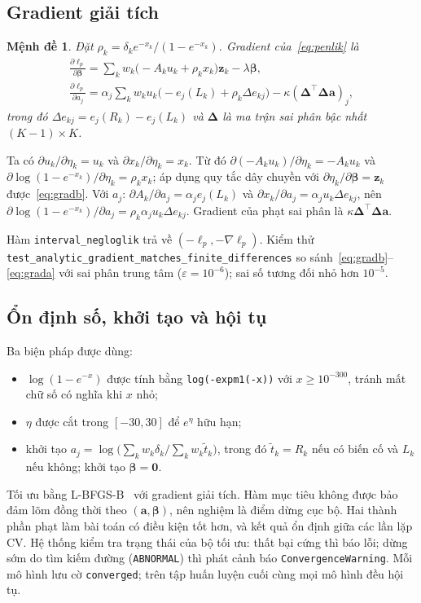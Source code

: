\documentclass[journal]{IEEEtran}
\newtheorem{proposition}{Mệnh đề}
\newcommand{\code}[1]{\texttt{#1}}
\begin{document}
\subsection{Gradient giải tích}
\begin{proposition}
Đặt $\rho_k=\delta_ke^{-x_k}/(1-e^{-x_k})$. Gradient của~\eqref{eq:penlik} là
\begin{gather}
\frac{\partial\ell_p}{\partial\bm\beta}=\sum_k w_k\bigl(-A_ku_k+\rho_kx_k\bigr)\bm z_k-\lambda\bm\beta,\label{eq:gradb}\\
\frac{\partial\ell_p}{\partial a_j}=\alpha_j\sum_k w_ku_k\bigl(-e_j(L_k)+\rho_k\Delta e_{kj}\bigr)-\kappa(\bm\Delta^\top\bm\Delta\bm a)_j,\label{eq:grada}
\end{gather}
trong đó $\Delta e_{kj}=e_j(R_k)-e_j(L_k)$ và $\bm\Delta$ là ma trận sai phân bậc nhất $(K-1)\times K$.
\end{proposition}
\begin{IEEEproof}
Ta có $\partial u_k/\partial\eta_k=u_k$ và $\partial x_k/\partial\eta_k=x_k$. Từ đó $\partial(-A_ku_k)/\partial\eta_k=-A_ku_k$ và $\partial\log(1-e^{-x_k})/\partial\eta_k=\rho_kx_k$; áp dụng quy tắc dây chuyền với $\partial\eta_k/\partial\bm\beta=\bm z_k$ được~\eqref{eq:gradb}. Với $a_j$: $\partial A_k/\partial a_j=\alpha_je_j(L_k)$ và $\partial x_k/\partial a_j=\alpha_ju_k\Delta e_{kj}$, nên $\partial\log(1-e^{-x_k})/\partial a_j=\rho_k\alpha_ju_k\Delta e_{kj}$. Gradient của phạt sai phân là $\kappa\bm\Delta^\top\bm\Delta\bm a$.
\end{IEEEproof}
Hàm \code{interval\_negloglik} trả về $(-\ell_p,-\nabla\ell_p)$. Kiểm thử \code{test\_analytic\_gradient\_matches\_finite\_differences} so sánh~\eqref{eq:gradb}--\eqref{eq:grada} với sai phân trung tâm ($\varepsilon=10^{-6}$); sai số tương đối nhỏ hơn $10^{-5}$.

\subsection{Ổn định số, khởi tạo và hội tụ}
Ba biện pháp được dùng:
\begin{itemize}
\item $\log(1-e^{-x})$ được tính bằng \code{log(-expm1(-x))} với $x\ge10^{-300}$, tránh mất chữ số có nghĩa khi $x$ nhỏ;
\item $\eta$ được cắt trong $[-30,30]$ để $e^\eta$ hữu hạn;
\item khởi tạo $a_j=\log\bigl(\sum_kw_k\delta_k/\sum_kw_k\tilde t_k\bigr)$, trong đó $\tilde t_k=R_k$ nếu có biến cố và $L_k$ nếu không; khởi tạo $\bm\beta=\bm 0$.
\end{itemize}
Tối ưu bằng L-BFGS-B~\cite{byrd1995} với gradient giải tích. Hàm mục tiêu không được bảo đảm lõm đồng thời theo $(\bm a,\bm\beta)$, nên nghiệm là điểm dừng cục bộ. Hai thành phần phạt làm bài toán có điều kiện tốt hơn, và kết quả ổn định giữa các lần lặp CV. Hệ thống kiểm tra trạng thái của bộ tối ưu: thất bại cứng thì báo lỗi; dừng sớm do tìm kiếm đường (\code{ABNORMAL}) thì phát cảnh báo \code{ConvergenceWarning}. Mỗi mô hình lưu cờ \code{converged}; trên tập huấn luyện cuối cùng mọi mô hình đều hội tụ.
\end{document}
